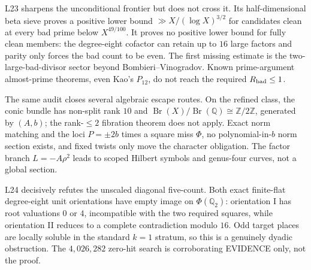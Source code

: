 \documentclass[11pt]{amsart}
\theoremstyle{definition}
\theoremstyle{remark}
\newcommand{\Q}{\mathbb{Q}}
\newcommand{\Z}{\mathbb{Z}}
\begin{document}
L23 sharpens the unconditional frontier but does not cross it.  Its
half-dimensional beta sieve proves a positive lower bound
\(\gg X/(\log X)^{3/2}\) for candidates clean at every bad prime below
\(X^{49/100}\).  It proves no positive lower bound for fully clean members:
the degree-eight cofactor can retain up to \(16\) large factors and parity
only forces the bad count to be even.  The first missing estimate is the
two-large-bad-divisor sector beyond Bombieri--Vinogradov.  Known
prime-argument almost-prime theorems, even Kao's \(P_{12}\), do not reach
the required \(R_{\rm bad}\le1\).

The same audit closes several algebraic escape routes.  On the refined
class, the conic bundle has non-split rank \(10\) and
\(\operatorname{Br}(X)/\operatorname{Br}(\Q)\cong\Z/2\Z\), generated by
\((A,b)\); the rank-\(\le2\) fibration theorem does not apply.  Exact norm
matching and the loci \(P=\pm2b\) times a square miss \(\Phi\), no
polynomial-in-\(b\) norm section exists, and fixed twists only move the
character obligation.  The factor branch \(L=-A\rho^2\) leads to scoped
Hilbert symbols and genus-four curves, not a global section.

L24 decisively refutes the unscaled diagonal five-count.  Both exact
finite-flat degree-eight unit orientations have empty image on
\(\Phi(\Q_2)\): orientation I has root valuations \(0\) or \(4\),
incompatible with the two required squares, while orientation II reduces
to a complete contradiction modulo \(16\).  Odd target places are locally
soluble in the standard \(k=1\) stratum, so this is a genuinely dyadic
obstruction.  The \(4{,}026{,}282\) zero-hit search is corroborating
EVIDENCE only, not the proof.
\end{document}

